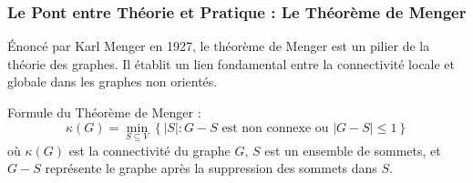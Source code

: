 \begin{frame}
\frametitle{Le Pont entre Théorie et Pratique : Le Théorème de Menger}
\begin{tcolorbox}[colback=orange!10,colframe=orange!100!black,
    title=\textbf{Théorème de Menger (1927)}]
    Énoncé par Karl Menger en 1927, le théorème de Menger est un pilier de la théorie des graphes. Il établit un lien fondamental entre la connectivité locale et globale dans les graphes non orientés.

    Formule du Théorème de Menger :
    $$ \kappa(G) = \min_{S \subseteq V} \left\{ |S| : G - S \text{ est non connexe ou } |G-S| \leq 1 \right\} $$
    où \( \kappa(G) \) est la connectivité du graphe \( G \), \( S \) est un ensemble de sommets, et \( G - S \) représente le graphe après la suppression des sommets dans \( S \).
\end{tcolorbox}
\end{frame}
